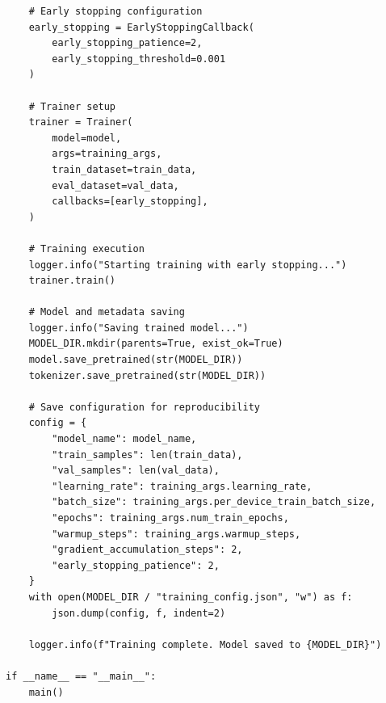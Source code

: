 \documentclass[12pt,a4paper,oneside]{report}
\begin{document}
\begin{lstlisting}
    # Early stopping configuration
    early_stopping = EarlyStoppingCallback(
        early_stopping_patience=2,
        early_stopping_threshold=0.001
    )
    
    # Trainer setup
    trainer = Trainer(
        model=model,
        args=training_args,
        train_dataset=train_data,
        eval_dataset=val_data,
        callbacks=[early_stopping],
    )
    
    # Training execution
    logger.info("Starting training with early stopping...")
    trainer.train()
    
    # Model and metadata saving
    logger.info("Saving trained model...")
    MODEL_DIR.mkdir(parents=True, exist_ok=True)
    model.save_pretrained(str(MODEL_DIR))
    tokenizer.save_pretrained(str(MODEL_DIR))
    
    # Save configuration for reproducibility
    config = {
        "model_name": model_name,
        "train_samples": len(train_data),
        "val_samples": len(val_data),
        "learning_rate": training_args.learning_rate,
        "batch_size": training_args.per_device_train_batch_size,
        "epochs": training_args.num_train_epochs,
        "warmup_steps": training_args.warmup_steps,
        "gradient_accumulation_steps": 2,
        "early_stopping_patience": 2,
    }
    with open(MODEL_DIR / "training_config.json", "w") as f:
        json.dump(config, f, indent=2)
    
    logger.info(f"Training complete. Model saved to {MODEL_DIR}")

if __name__ == "__main__":
    main()
\end{lstlisting}
\end{document}
